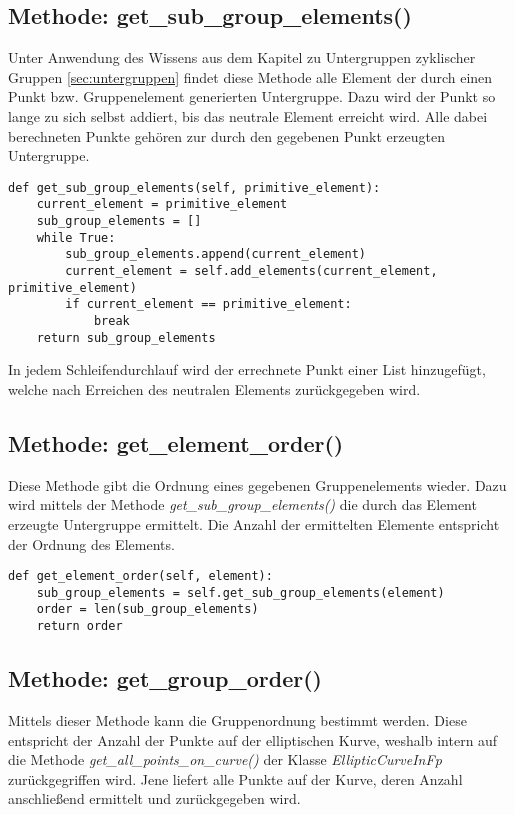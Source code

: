 \subsection{Methode: get\_sub\_group\_elements()}
Unter Anwendung des Wissens aus dem Kapitel zu Untergruppen zyklischer Gruppen \ref{sec:untergruppen} findet diese Methode alle Element der durch einen Punkt bzw. Gruppenelement generierten Untergruppe. Dazu wird der Punkt so lange zu sich selbst addiert, bis das neutrale Element erreicht wird. Alle dabei berechneten Punkte gehören zur durch den gegebenen Punkt erzeugten Untergruppe.

\vspace{\baselineskip}
\begin{lstlisting}[caption={Methode: get\_sub\_group\_elements()}, captionpos=b]
def get_sub_group_elements(self, primitive_element):
    current_element = primitive_element
    sub_group_elements = []
    while True:
        sub_group_elements.append(current_element)
        current_element = self.add_elements(current_element, primitive_element)
        if current_element == primitive_element:
            break
    return sub_group_elements
\end{lstlisting}
\vspace{\baselineskip}

In jedem Schleifendurchlauf wird der errechnete Punkt einer List hinzugefügt, welche nach Erreichen des neutralen Elements zurückgegeben wird.

\subsection{Methode: get\_element\_order()}
Diese Methode gibt die Ordnung eines gegebenen Gruppenelements wieder. Dazu wird mittels der Methode \textit{get\_sub\_group\_elements()} die durch das Element erzeugte Untergruppe ermittelt. Die Anzahl der ermittelten Elemente entspricht der Ordnung des Elements.

\vspace{\baselineskip}
\begin{lstlisting}[caption={Methode: get\_element\_order()}, captionpos=b]
def get_element_order(self, element):
	sub_group_elements = self.get_sub_group_elements(element)
	order = len(sub_group_elements)
    return order
\end{lstlisting}
\vspace{\baselineskip}

\subsection{Methode: get\_group\_order()}
Mittels dieser Methode kann die Gruppenordnung bestimmt werden. Diese entspricht der Anzahl der Punkte auf der elliptischen Kurve, weshalb intern auf die Methode \textit{get\_all\_points\_on\_curve()} der Klasse \textit{EllipticCurveInFp} zurückgegriffen wird. Jene liefert alle Punkte auf der Kurve, deren Anzahl anschließend ermittelt und zurückgegeben wird.

